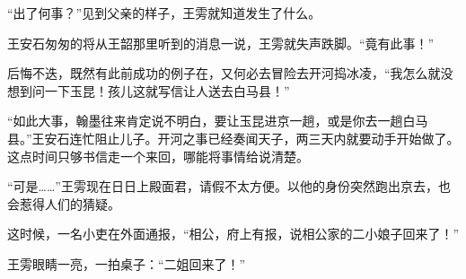 “出了何事？”见到父亲的样子，王雱就知道发生了什么。

王安石匆匆的将从王韶那里听到的消息一说，王雱就失声跌脚。“竟有此事！”

后悔不迭，既然有此前成功的例子在，又何必去冒险去开河捣冰凌，“我怎么就没想到问一下玉昆！孩儿这就写信让人送去白马县！”

“如此大事，翰墨往来肯定说不明白，要让玉昆进京一趟，或是你去一趟白马县。”王安石连忙阻止儿子。开河之事已经奏闻天子，两三天内就要动手开始做了。这点时间只够书信走一个来回，哪能将事情给说清楚。

“可是……”王雱现在日日上殿面君，请假不太方便。以他的身份突然跑出京去，也会惹得人们的猜疑。

这时候，一名小吏在外面通报，“相公，府上有报，说相公家的二小娘子回来了！”

王雱眼睛一亮，一拍桌子：“二姐回来了！”

